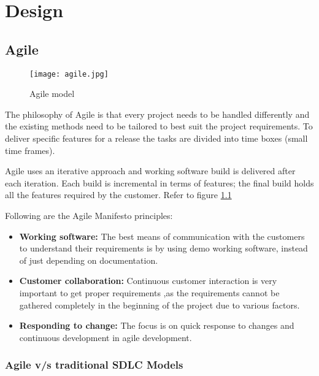 \chapter{Design}

\section{Agile}

\begin{figure}[h!]
    \begin{center}
        \texttt{[image: agile.jpg]}
    \end{center}
    \caption{Agile model}
    \label{fig:agile}
\end{figure}

The philosophy of Agile is that every project needs to be handled differently and the existing methods
need to be tailored to best suit the project requirements. To deliver specific features for a 
release the tasks are divided into time boxes (small time frames).

Agile uses an iterative approach and  working software build is delivered after each iteration. 
Each build is incremental in terms of features; the final build holds all the features required 
by the customer. Refer to figure \ref{fig:agile}

Following are the Agile Manifesto principles:

\begin{itemize}
    \item \textbf{Working software:} The best means of communication with the customers to understand
    their requirements is by using demo working software, instead of just depending on documentation.
     
    \item \textbf{Customer collaboration:} Continuous customer interaction is very important to get proper
    requirements ,as the requirements cannot be gathered completely in the beginning of the project due 
    to various factors.

    \item \textbf{Responding to change:} The focus is on quick response to changes and 
    continuous development in agile development.
\end{itemize}

\subsection{Agile v/s traditional SDLC Models}

